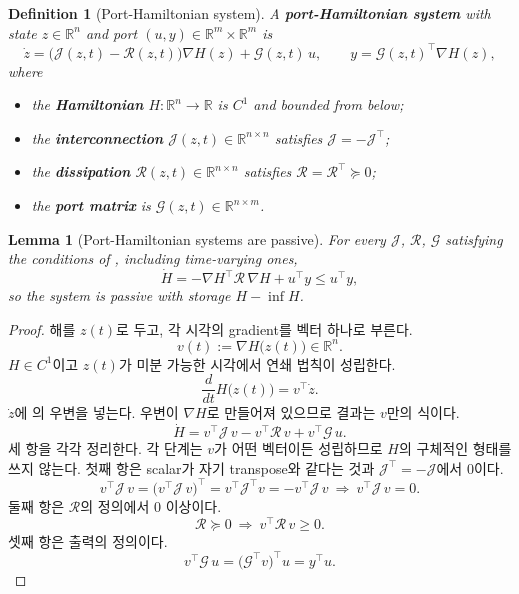 \documentclass[11pt]{article}\usepackage[margin=1in]{geometry}\usepackage{amsmath,amssymb,amsthm,mathtools}\usepackage{graphicx}\graphicspath{{figures/}{../figures/}{figs/}{./}}\usepackage{enumitem}\usepackage{hyperref}\usepackage{cleveref}\usepackage{tikz}\usetikzlibrary{arrows.meta,positioning,calc,shapes.geometric}\usepackage{float}\usepackage{rotating}\usepackage[most]{tcolorbox}\usepackage{kotex}\usepackage{booktabs}\emergencystretch=1.6em\tolerance=2000 \crefname{assumption}{Assumption}{Assumptions}\Crefname{assumption}{Assumption}{Assumptions}\crefname{definition}{Definition}{Definitions}\Crefname{definition}{Definition}{Definitions}\crefname{proposition}{Proposition}{Propositions}\Crefname{proposition}{Proposition}{Propositions}\crefname{fact}{Fact}{Facts}\Crefname{fact}{Fact}{Facts} \newtheorem{assumption}{Assumption}\newtheorem{definition}{Definition}\newtheorem{lemma}{Lemma}\newtheorem{proposition}{Proposition}\newtheorem{theorem}{Theorem}\newtheorem{corollary}{Corollary}\newtheorem{fact}{Fact}\theoremstyle{remark}\newtheorem{remark}{Remark} \newcommand{\R}{\mathbb{R}}\newcommand{\xb}{\bar x}\newcommand{\Ab}{\bar A}\newcommand{\By}{\bar B_y}\newcommand{\U}{\mathcal U}\newcommand{\Z}{\mathcal Z}
\begin{document}
\begin{definition}[Port-Hamiltonian system]
\label{def:ph}
A \textbf{\emph{port-Hamiltonian system}} with state $z\in\R^{n}$ and port $(u,y)\in\R^m\times\R^m$ is
\[
\dot z=\big(\mathcal J(z,t)-\mathcal R(z,t)\big)\nabla H(z)+\mathcal G(z,t)\,u,\qquad y=\mathcal G(z,t)^\top\nabla H(z),
\]
where
\begin{itemize}
\item the \textbf{\emph{Hamiltonian}} $H:\R^n\to\R$ is $C^1$ and bounded from below;
\item the \textbf{\emph{interconnection}} $\mathcal J(z,t)\in\R^{n\times n}$ satisfies $\mathcal J=-\mathcal J^\top$;
\item the \textbf{\emph{dissipation}} $\mathcal R(z,t)\in\R^{n\times n}$ satisfies $\mathcal R=\mathcal R^\top\succeq0$;
\item the \textbf{\emph{port matrix}} is $\mathcal G(z,t)\in\R^{n\times m}$.
\end{itemize}
\end{definition}

\begin{lemma}[Port-Hamiltonian systems are passive]
\label{lem:phpassive}
For every $\mathcal J$, $\mathcal R$, $\mathcal G$ satisfying the conditions of , including time-varying ones,
\[
\dot H=-\nabla H^\top\mathcal R\,\nabla H+u^\top y\le u^\top y ,
\]
so the system is passive with storage $H-\inf H$.
\end{lemma}

\begin{proof}
해를 $z(t)$로 두고, 각 시각의 gradient를 벡터 하나로 부른다.
\[
v(t):=\nabla H\big(z(t)\big)\in\R^n .
\]
$H\in C^1$이고 $z(t)$가 미분 가능한 시각에서 연쇄 법칙이 성립한다.
\[
\frac{d}{dt}H\big(z(t)\big)=v^\top\dot z .
\]
$\dot z$에 의 우변을 넣는다. 우변이 $\nabla H$로 만들어져 있으므로 결과는 $v$만의 식이다.
\[
\dot H=v^\top\mathcal J\,v-v^\top\mathcal R\,v+v^\top\mathcal G\,u .
\]
세 항을 각각 정리한다. 각 단계는 $v$가 어떤 벡터이든 성립하므로 $H$의 구체적인 형태를 쓰지 않는다. 첫째 항은 scalar가 자기 transpose와 같다는 것과 $\mathcal J^\top=-\mathcal J$에서 0이다.
\[
v^\top\mathcal J\,v=\big(v^\top\mathcal J\,v\big)^\top=v^\top\mathcal J^\top v=-v^\top\mathcal J\,v\ \Longrightarrow\ v^\top\mathcal J\,v=0 .
\]
둘째 항은 $\mathcal R$의 정의에서 0 이상이다.
\[
\mathcal R\succeq0\ \Longrightarrow\ v^\top\mathcal R\,v\ge0 .
\]
셋째 항은 출력의 정의이다.
\[
v^\top\mathcal G\,u=\big(\mathcal G^\top v\big)^\top u=y^\top u .
\]
\end{proof}
\end{document}

